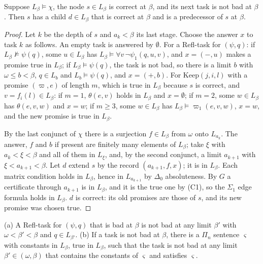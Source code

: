 \documentclass[11pt]{article}
\begin{document}
\begin{statement} Suppose $L_\beta \models \chi$, the node $s \in L_\beta$ is correct at
$\beta$, and its next task is not bad at $\beta$. Then $s$ has a child $d \in L_\beta$ that is correct at $\beta$ and
is a predecessor of $s$ at $\beta$.
\end{statement}

\begin{proof}
Let $k$ be the depth of $s$ and $a_k < \beta$ its last stage. Choose the answer $x$ to task $k$ as follows. An empty
task is answered by $\emptyset$. For a Refl-task for $(\psi, q)$: if $L_\beta \nvDash \psi(q)$, some $u \in L_\beta$ has
$L_\beta \models \forall v\, \neg\psi_1(q,u,v)$, and $x = (-, u)$ makes a promise true in $L_\beta$; if $L_\beta \models
\psi(q)$, the task is not bad, so there is a limit $b$ with $\omega \le b < \beta$, $q \in L_b$ and $L_b \models
\psi(q)$, and $x = (+, b)$. For $\mathrm{Keep}(j,i,l)$ with a promise $(\varpi, e)$ of length $m$, which is true in
$L_\beta$ because $s$ is correct, and $v = f_i(l) \in L_\beta$: if $m = 1$, $\theta(e,v)$ holds in $L_\beta$ and $x =
\emptyset$; if $m = 2$, some $w \in L_\beta$ has $\theta(e,v,w)$ and $x = w$; if $m \ge 3$, some $w \in L_\beta$ has
$L_\beta \models \varpi_1(e,v,w)$, $x = w$, and the new promise is true in $L_\beta$.

By the last conjunct of $\chi$ there is a surjection $f \in L_\beta$ from $\omega$ onto $L_{a_k}$. The answer, $f$ and
$b$ if present are finitely many elements of $L_\beta$; take $\xi$ with $a_k < \xi < \beta$ and all of them in $L_\xi$,
and, by the second conjunct, a limit $a_{k+1}$ with $\xi < a_{k+1} < \beta$. Let $d$ extend $s$ by the record
$(a_{k+1}, f, x)$; it is in $L_\beta$. Each matrix condition holds in $L_\beta$, hence in $L_{a_{k+1}}$ by $\Delta_0$
absoluteness. By $G$ a certificate through $a_{k+1}$ is in $L_\beta$, and it is the true one by (C1), so the $\Sigma_1$
edge formula holds in $L_\beta$. $d$ is correct: its old promises are those of $s$, and its new promise was chosen
true.
\end{proof}

\begin{statement} (a) A Refl-task for $(\psi,q)$ that is bad at $\beta$ is not bad at any
limit $\beta'$ with $\omega < \beta' < \beta$ and $q \in L_{\beta'}$. (b) If a task is not bad at $\beta$, there is a
$\Pi_n$ sentence $\varsigma$ with constants in $L_\beta$, true in $L_\beta$, such that the task is not bad at any limit
$\beta' \in (\omega, \beta)$ that contains the constants of $\varsigma$ and satisfies $\varsigma$.
\end{statement}
\end{document}
